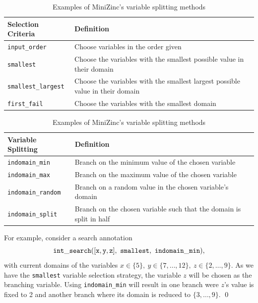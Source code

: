 \begin{table}[tpb]
	\def\arraystretch{1.2}
	\centering
	\caption{Examples of MiniZinc's variable selection criteria}
	\vspace{2mm}
	\begin{tabular}{p{}p{}}
		\toprule
		Selection Criteria & Definition \\
		\midrule\midrule
		{\tt input\_order} & Choose variables in the order given \\
		{\tt smallest} & Choose the variables with the smallest possible value in their domain \\
		{\tt smallest\_largest} & Choose the variables with the smallest largest possible value in their domain \\
		{\tt first\_fail} & Choose the variables with the smallest domain \\
		\bottomrule
	\end{tabular}
	\label{tab:selectCrit}

	\caption{Examples of MiniZinc's variable splitting methods}
	\vspace{2mm}
	\begin{tabular}{p{}p{}}
		\toprule
		Variable Splitting & Definition \\
		\midrule\midrule
		{\tt indomain\_min} & Branch on the minimum value of the chosen variable \\
		{\tt indomain\_max} & Branch on the maximum value of the chosen variable \\
		{\tt indomain\_random} & Branch on a random value in the  chosen variable's domain \\
		{\tt indomain\_split} & Branch on the chosen variable such that the domain is split in half \\
		\bottomrule
	\end{tabular}
	\label{tab:valueSplit}
\end{table}

\begin{example}\label{ex:lit:basicSearch}
	For example, consider a search annotation 
	$${\tt int\_search([x,y,z],~smallest,~indomain\_min)},$$
	with current domains of the variables $x\in\{5\},\:y\in\{7,\ldots,12\},\:z\in\{2,\ldots,9\}$.
	As we have the {\tt smallest} variable selection strategy, the variable $z$ will be chosen
	as the branching variable. Using {\tt indomain\_min} will result in one branch were $z$'s value
	is fixed to 2 and another branch where its domain is reduced to $\{3,\ldots,9\}$. \qed
\end{example}

